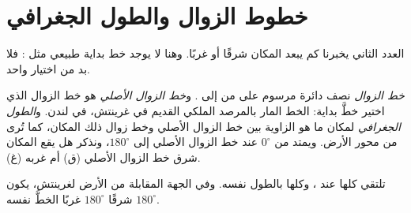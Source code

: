 \section{خطوط الزوال والطول الجغرافي}

العدد الثاني يخبرنا كم يبعد المكان شرقًا أو غربًا. وهنا لا يوجد
خط بداية طبيعي مثل : فلا بد من اختيار واحد.

\begin{definition}\label{def:g6:latitude-longitude:longitude}
\emph{خط الزوال} نصف دائرة مرسوم على  من
 إلى . و\emph{خط الزوال الأصلي}
هو خط الزوال الذي اختير خطَّ بداية: الخط المار
بالمرصد الملكي القديم في غرينتش، في لندن.
و\emph{الطول الجغرافي} لمكان ما هو الزاوية بين خط الزوال
الأصلي وخط زوال ذلك المكان، كما تُرى من محور الأرض. ويمتد
من $0^\circ$ عند خط الزوال الأصلي إلى $180^\circ$، ونذكر هل
يقع المكان شرق خط الزوال الأصلي (ق) أم غربه (غ).
\end{definition}

تلتقي  كلها عند ، وكلها بالطول نفسه. وفي
الجهة المقابلة من الأرض لغرينتش، يكون  $180^\circ$ شرقًا
 $180^\circ$ غربًا الخطَّ نفسه.

